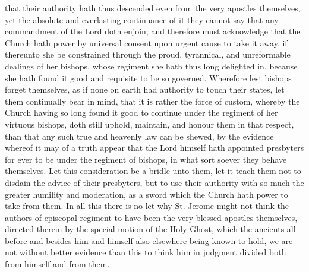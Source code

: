 that their authority hath thus descended even from the very apostles themselves, yet the absolute and everlasting continuance of it they cannot say that any commandment of the Lord doth enjoin; and therefore must acknowledge that the Church hath power by universal consent upon urgent cause to take it away, if thereunto she be constrained through the proud, tyrannical, and unreformable dealings of her bishops, whose regiment she hath thus long delighted in, because she hath found it good and requisite to be so governed. Wherefore lest bishops forget themselves, as if none on earth had authority to touch their states, let them continually bear in mind, that it is  rather the force of custom,
 whereby the Church having so long found it good to continue under the regiment of her virtuous bishops, doth still uphold, maintain, and honour them in that respect, than that any such true and heavenly law can be shewed, by the evidence whereof it may of a truth appear that the Lord himself hath appointed presbyters for ever to be under the regiment of bishops, in what sort soever they behave themselves. Let this consideration be a bridle unto them, let it teach them not to disdain the advice of their presbyters, but to use their authority with so much the greater humility and moderation, as a sword which the Church hath power to take from them. In all this there is no let why St. Jerome might not think the authors of episcopal regiment to have been the very blessed apostles themselves, directed therein by the special motion of the Holy Ghost, which the ancients all before and besides him and himself also elsewhere being known to hold, we are not without better evidence than this to think him in judgment divided both from himself and from them.


